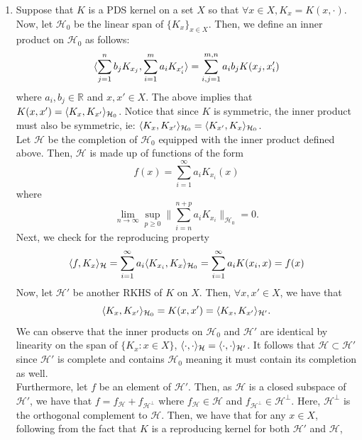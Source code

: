 \documentclass[12pt]{article}
\begin{document}
\begin{enumerate}[topsep=0pt, partopsep=0pt, itemsep=0pt, label=(\roman*)]
    \item Suppose that $K$ is a PDS kernel on a set $X$ so that $\forall x \in X, K_x = K(x, \cdot)$.
        Now, let $\mathcal{H}_0$ be the linear span of $\{K_x\}_{x\in X}$. Then, we define an inner 
        product on $\mathcal{H}_0$ as follows:
        \[
            \langle \sum_{j=1}^n b_j K_{x_j},\sum_{i=1}^m a_i K_{x'_i}\rangle = \sum_{i,j=1}^{m,n} a_i b_j K(x_j, x'_i)
        \]
        where $a_i, b_j \in \mathbb{R}$ and $x, x' \in X$. The above implies that $K(x,x')=\langle K_x,K_{x'}\rangle_{\mathcal{H}_0}$.
        Notice that since $K$ is symmetric, the inner product must also be symmetric, ie:
        $\langle K_x,K_{x'}\rangle_{\mathcal{H}_0} = \langle K_{x'},K_x\rangle_{\mathcal{H}_0}$. \\
        Let $\mathcal{H}$ be the completion of $\mathcal{H}_0$ equipped with the inner product defined above.
        Then, $\mathcal{H}$ is made up of functions of the form
        \[
            f(x) = \sum_{i=1}^{\infty} a_i K_{x_i}(x)
        \]
        where 
        \[
            \lim_{n\to \infty} \sup_{p\geq 0} \| \sum_{i=n}^{n+p} a_i K_{x_i} \|_{\mathcal{H}_0} = 0.
        \] 
        Next, we check for the reproducing property
        \[
            \langle f,K_x\rangle_{\mathcal{H}} = \sum_{i=1}^{\infty} a_i \langle K_{x_i},K_x\rangle_{\mathcal{H}_0} = \sum_{i=1}^{\infty} a_i K(x_i, x) = f(x)
        \]
        Now, let $\mathcal{H}'$ be another RKHS of $K$ on $X$. Then, $\forall x,x' \in X$, we have that
        \[
            \langle K_x,K_{x'}\rangle_{\mathcal{H}_0} = K(x,x') = \langle K_x,K_{x'}\rangle_{\mathcal{H}'}.
        \]
        We can observe that the inner products on $\mathcal{H}_0$ and $\mathcal{H}'$ are identical by linearity
        on the span of $\{K_x : x\in X\}$, $\langle \cdot,\cdot\rangle_\mathcal{H} = \langle \cdot,\cdot\rangle_{\mathcal{H}'}$.
        It follows that $\mathcal{H} \subset \mathcal{H}'$ since $\mathcal{H}'$ is complete and contains
        $\mathcal{H}_0$ meaning it must contain its completion as well. \\
        Furthermore, let $f$ be an element of $\mathcal{H}'$. Then, as $\mathcal{H}$ is a closed subspace of $\mathcal{H}'$,
        we have that $f = f_{\mathcal{H}} + f_{\mathcal{H}^\perp}$ where $f_{\mathcal{H}} \in \mathcal{H}$ and
        $f_{\mathcal{H}^\perp} \in \mathcal{H}^\perp$. Here, $\mathcal{H}^\perp$ is the orthogonal complement to $\mathcal{H}$.
        Then, we have that for any $x \in X$, following from the fact that $K$ is a reproducing kernel for both $\mathcal{H}'$
        and $\mathcal{H}$,
        \begin{align*}

\end{align*}
\end{enumerate}
\end{document}
